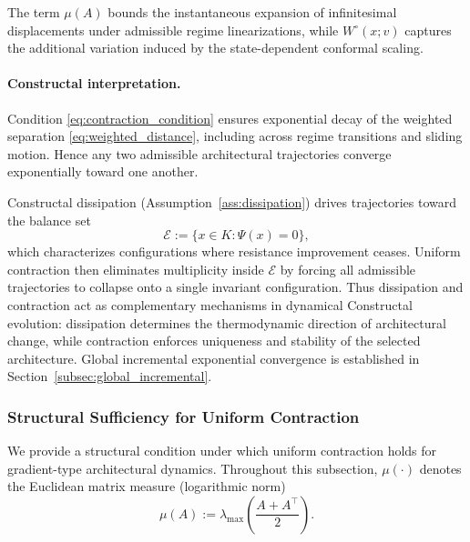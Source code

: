 \documentclass[12pt]{article}
\theoremstyle{plain}
\theoremstyle{definition}
\theoremstyle{remark}
\begin{document}
The term $\mu(A)$ bounds the instantaneous expansion of
infinitesimal displacements under admissible regime
linearizations, while $W^\circ(x;v)$ captures the additional
variation induced by the state-dependent conformal scaling.

\paragraph{Constructal interpretation.}

Condition \eqref{eq:contraction_condition}
ensures exponential decay of the weighted separation
\eqref{eq:weighted_distance}, including across regime
transitions and sliding motion.
Hence any two admissible architectural trajectories converge
exponentially toward one another.

Constructal dissipation
(Assumption~\ref{ass:dissipation})
drives trajectories toward the balance set
\begin{equation}
\mathcal E :=
\{x\in K:\Psi(x)=0\},
\label{eq:balance_set_contraction}
\end{equation}
which characterizes configurations where resistance
improvement ceases.
Uniform contraction then eliminates multiplicity inside
$\mathcal E$ by forcing all admissible trajectories to
collapse onto a single invariant configuration. Thus dissipation and contraction act as complementary
mechanisms in dynamical Constructal evolution:
dissipation determines the thermodynamic direction of
architectural change, while contraction enforces uniqueness
and stability of the selected architecture.
Global incremental exponential convergence is established in
Section~\ref{subsec:global_incremental}.



\subsubsection{Structural Sufficiency for Uniform Contraction}
\label{subsubsec:structural_contraction}

We provide a structural condition under which uniform contraction holds
for gradient-type architectural dynamics.
Throughout this subsection, $\mu(\cdot)$ denotes the Euclidean matrix
measure (logarithmic norm)
\begin{equation}
\mu(A)
:=
\lambda_{\max}\!\left(\frac{A+A^\top}{2}\right).
\label{eq:matrix_measure_structural}
\end{equation}
\end{document}
